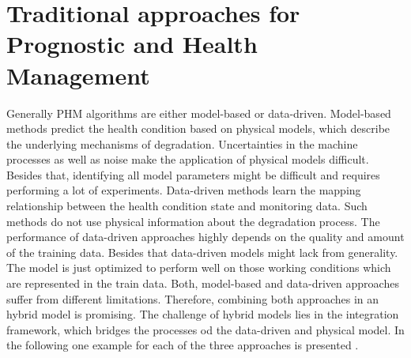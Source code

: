 \begin{comment}
The number of IMFs extracted roughly equals $log_{2}(N)$ where $N$ is the number of extrema in the signal. The EMD decomposes the non-stationary signal in its locally and non-overlapping component IMFs. This process does not need any predefined wave-forms like the wavelet transformations. The selection of the IMFs is an automatic and adaptive time-variant filtering \cite{Faltermeier2010}. Compared to the Fourier and Wavelet transform, the decomposition of the signal in several IMFS does not divide the signal into fixed frequency components, which gives this method a higher time-frequency resolution \cite{Verstraete2017}. The popular Hilbert-Huang Transform (HHT) combines the EMD with the Hilbert spectral analysis, where the Hilbert transform is applied to each of the detected IMFs. A corresponding analytical signal can be constructed. Also the Hilbert amplitude and energy spectrum can be derived. For more Hilbert-specific details Feng et al. \cite{FENG2013} can be studied.
\end{comment}

\section{Traditional approaches for Prognostic and Health Management}

Generally PHM algorithms are either model-based or data-driven. Model-based methods predict the health condition based on physical models, which describe the underlying mechanisms of degradation. Uncertainties in the machine processes as well as noise make the application of physical models difficult. Besides that, identifying all model parameters might be difficult and requires performing a lot of experiments. Data-driven methods learn the mapping relationship between the health condition state and monitoring data. Such methods do not use physical information about the degradation process. The performance of data-driven approaches highly depends on the quality and amount of the training data. Besides that data-driven models might lack from generality. The model is just optimized to perform well on those working conditions which are represented in the train data. Both, model-based and data-driven approaches suffer from different limitations. Therefore, combining both approaches in an hybrid model is promising. The challenge of hybrid models lies in the integration framework, which bridges the processes od the data-driven and physical model. In the following one example for each of the three approaches is presented \cite{DENG2020}. 

